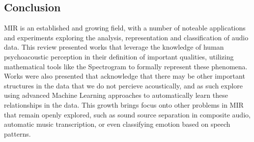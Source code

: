 \documentclass[twoside]{article}
\begin{document}
\begin{multicols}{2}
\section{Conclusion}
MIR is an established and growing field, with a number of noteable applications and experiments exploring the analysis, representation and classification of audio data. This review presented works that leverage the knowledge of human psychoacoustic perception in their definition of important qualities, utilizing mathematical tools like the Spectrogram to formally represent these phenomena. Works were also presented that acknowledge that there may be other important structures in the data that we do not percieve acoustically, and as such explore using advanced Machine Learning approaches to automatically learn these relationships in the data. This growth brings focus onto other problems in MIR that remain openly explored, such as sound source separation in composite audio, automatic music transcription, or even classifying emotion based on speech patterns.

{}


% 


\end{multicols}
\end{document}
